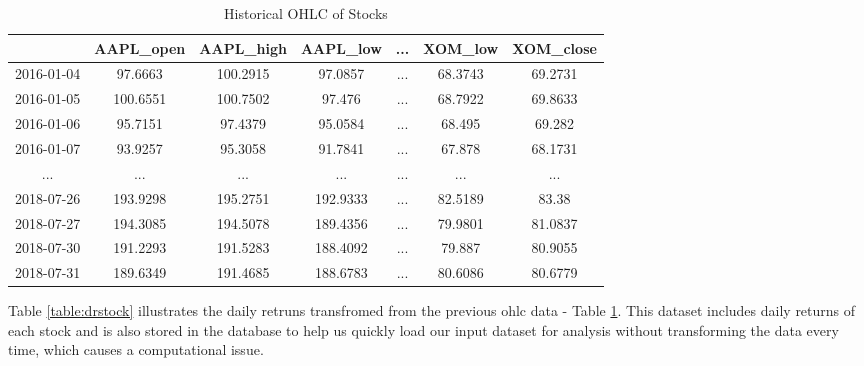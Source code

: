 \documentclass[11pt]{article} %
\theoremstyle{plain}
\theoremstyle{definition}
\begin{document}
{
  \begin{table}[ht]
    \centering
    \scriptsize
    \begin{tabular}{|c|c c c c c c|}
      \hline
       & AAPL\_open & AAPL\_high & AAPL\_low & ... & XOM\_low & XOM\_close \\ [0.5ex]
      \hline
      2016-01-04 & 97.6663 & 100.2915 & 97.0857 & ... & 68.3743 & 69.2731 \\
      \hline
      2016-01-05 & 100.6551 & 100.7502 & 97.476 & ... & 68.7922 & 69.8633 \\
      \hline
      2016-01-06 & 95.7151 & 97.4379 & 95.0584 & ... & 68.495 & 69.282 \\
      \hline
      2016-01-07 & 93.9257 & 95.3058 & 91.7841 & ... & 67.878 & 68.1731 \\
      \hline
      ... & ... & ... & ... & ... & ... & ... \\
      \hline
      2018-07-26 & 193.9298 & 195.2751 & 192.9333 & ... & 82.5189 & 83.38 \\
      \hline
      2018-07-27 & 194.3085 & 194.5078 & 189.4356 & ... & 79.9801 & 81.0837 \\
      \hline
      2018-07-30 & 191.2293 & 191.5283 & 188.4092 & ... & 79.887 & 80.9055 \\
      \hline
      2018-07-31 & 189.6349 & 191.4685 & 188.6783 & ... & 80.6086 & 80.6779 \\
      \hline
    \end{tabular}
    \caption{Historical OHLC of Stocks}
    \label{table:ohlcstock}
  \end{table}
}

Table \ref{table:drstock} illustrates the daily retruns transfromed from the previous ohlc data - Table \ref{table:ohlcstock}. This dataset includes daily returns of each stock and is also stored in the database to help us quickly load our input dataset for analysis without transforming the data every time, which causes a computational issue.
\end{document}
